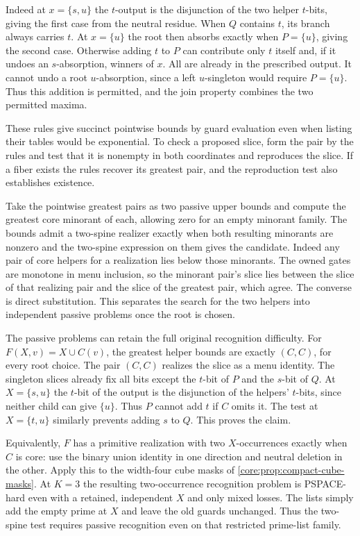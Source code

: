 Indeed at $x=\{s,u\}$ the $t$-output is the
disjunction of the two helper $t$-bits, giving
the first case from the neutral residue. When
$Q$ contains $t$, its branch always carries $t$.
At $x=\{u\}$ the root then absorbs exactly when
$P=\{u\}$, giving the second case. Otherwise
adding $t$ to $P$ can contribute only $t$ itself
and, if it undoes an $s$-absorption, winners of
$x$. All are already in the prescribed output.
It cannot undo a root $u$-absorption, since a
left $u$-singleton would require $P=\{u\}$.
Thus this addition is permitted, and the join
property combines the two permitted maxima.

These rules give succinct pointwise bounds by
guard evaluation even when listing their tables
would be exponential. To check a proposed slice,
form the pair by the rules and test that it is
nonempty in both coordinates and reproduces the
slice. If a fiber exists the rules recover its
greatest pair, and the reproduction test also
establishes existence.

Take the pointwise greatest pairs as two passive
upper bounds and compute the greatest core
minorant of each, allowing zero for an empty
minorant family. The bounds admit a two-spine
realizer exactly when both resulting minorants
are nonzero and the two-spine expression on them
gives the candidate. Indeed any pair of core
helpers for a realization lies below those
minorants. The owned gates are monotone in menu
inclusion, so the minorant pair's slice lies
between the slice of that realizing pair and the
slice of the greatest pair, which agree. The
converse is direct substitution. This separates
the search for the two helpers into independent
passive problems once the root is chosen.

The passive problems can retain the full original
recognition difficulty. For $F(X,v)=X\cup C(v)$,
the greatest helper bounds are exactly $(C,C)$,
for every root choice. The pair $(C,C)$ realizes
the slice as a menu identity. The singleton slices
already fix all bits except the $t$-bit of $P$
and the $s$-bit of $Q$. At $X=\{s,u\}$ the
$t$-bit of the output is the disjunction of the
helpers' $t$-bits, since neither child can give
$\{u\}$. Thus $P$ cannot add $t$ if $C$ omits
it. The test at $X=\{t,u\}$ similarly prevents
adding $s$ to $Q$. This proves the claim.

Equivalently, $F$ has a primitive realization
with two $X$-occurrences exactly when $C$ is core:
use the binary union identity in one direction
and neutral deletion in the other. Apply this to
the width-four cube masks of
\cref{core:prop:compact-cube-masks}. At $K=3$
the resulting two-occurrence recognition problem
is PSPACE-hard even with a retained, independent
$X$ and only mixed losses. The lists simply add
the empty prime at $X$ and leave the old guards
unchanged. Thus the two-spine test requires
passive recognition even on that restricted
prime-list family.

